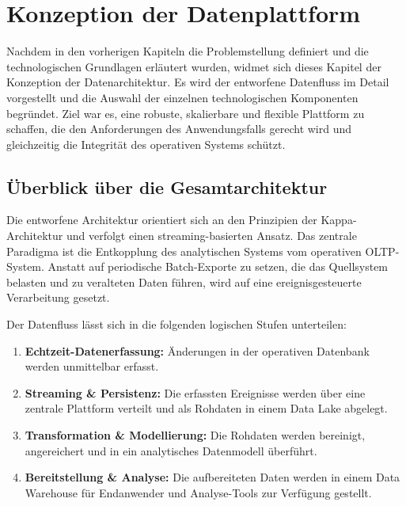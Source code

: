 \documentclass[
    12pt,               
    a4paper,        
    ngerman            
]{scrartcl}
\begin{document}
\section{Konzeption der Datenplattform}
Nachdem in den vorherigen Kapiteln die Problemstellung definiert und die technologischen Grundlagen erläutert wurden, widmet sich dieses Kapitel der Konzeption der Datenarchitektur. Es wird der entworfene Datenfluss im Detail vorgestellt und die Auswahl der einzelnen technologischen Komponenten begründet. Ziel war es, eine robuste, skalierbare und flexible Plattform zu schaffen, die den Anforderungen des Anwendungsfalls gerecht wird und gleichzeitig die Integrität des operativen Systems schützt.

\subsection{Überblick über die Gesamtarchitektur}
\label{sec:gesamtarchitektur}

Die entworfene Architektur orientiert sich an den Prinzipien der Kappa-Architektur und verfolgt einen streaming-basierten Ansatz. Das zentrale Paradigma ist die Entkopplung des analytischen Systems vom operativen OLTP-System. Anstatt auf periodische Batch-Exporte zu setzen, die das Quellsystem belasten und zu veralteten Daten führen, wird auf eine ereignisgesteuerte Verarbeitung gesetzt.

Der Datenfluss lässt sich in die folgenden logischen Stufen unterteilen: 
\begin{enumerate}
    \item \textbf{Echtzeit-Datenerfassung:} Änderungen in der operativen Datenbank werden unmittelbar erfasst.
    \item \textbf{Streaming \& Persistenz:} Die erfassten Ereignisse werden über eine zentrale Plattform verteilt und als Rohdaten in einem Data Lake abgelegt.
    \item \textbf{Transformation \& Modellierung:} Die Rohdaten werden bereinigt, angereichert und in ein analytisches Datenmodell überführt.
    \item \textbf{Bereitstellung \& Analyse:} Die aufbereiteten Daten werden in einem Data Warehouse für Endanwender und Analyse-Tools zur Verfügung gestellt.
\end{enumerate}
\end{document}
